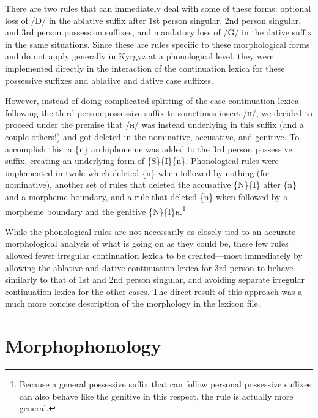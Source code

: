 \documentclass[10pt,a4paper,twocolumn]{article}
\begin{document}
There are two rules that can immediately deal with some of these forms: optional loss of /D/ in the ablative suffix after 1st person singular, 2nd person singular, and 3rd person possession suffixes, and mandatory loss of /G/ in the dative suffix in the same situations.  Since these are rules specific to these morphological forms and do not apply generally in Kyrgyz at a phonological level, they were implemented directly in the interaction of the continuation lexica for these possessive suffixes and ablative and dative case suffixes.

However, instead of doing complicated splitting of the case continuation lexica following the third person possessive suffix to sometimes insert /н/, we decided to proceed under the premise that /н/ was instead underlying in this suffix (and a couple others!) and got deleted in the nominative, accusative, and genitive.  To accomplish this, a \{n\} archiphoneme was added to the 3rd person possessive suffix, creating an underlying form of \{S\}\{I\}\{n\}.  Phonological rules were implemented in twolc which deleted \{n\} when followed by nothing (for nominative), another set of rules that deleted the accusative \{N\}\{I\} after \{n\} and a morpheme boundary, and a rule that deleted \{n\} when followed by a morpheme boundary and the genitive \{N\}\{I\}н.\footnote{Because a general possessive suffix that can follow personal possessive suffixes can also behave like the genitive in this respect, the rule is actually more general.}

While the phonological rules are not necessarily as closely tied to an accurate morphological analysis of what is going on as they could be, these few rules allowed fewer irregular continuation lexica to be created---most immediately by allowing the ablative and dative continuation lexica for 3rd person to behave similarly to that of 1st and 2nd person singular, and avoiding separate irregular continuation lexica for the other cases.  The direct result of this approach was a much more concise description of the morphology in the lexicon file.

\section{Morphophonology}
\end{document}
